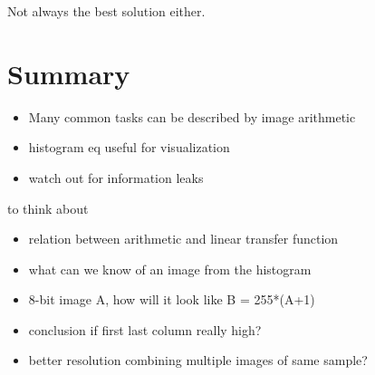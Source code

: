 \documentclass[a4paper]{article}
\begin{document}
Not always the best solution either. 


\section{Summary}

\begin{itemize}
    \item Many common tasks can be described by image arithmetic
    \item histogram eq useful for visualization 
    \item watch out for information leaks
\end{itemize}

to think about
\begin{itemize}
    \item relation between arithmetic and linear transfer function
    \item what can we know of an image from the histogram
    \item 8-bit image A, how will it look like B = 255*(A+1)
    \item conclusion if first last column really high?
    \item better resolution combining multiple images of same sample?
\end{itemize}




\end{document}
